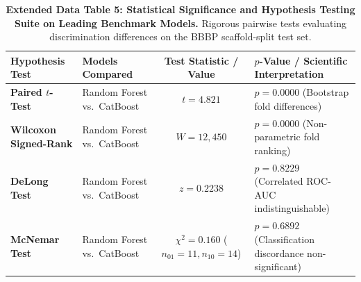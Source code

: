 \begin{table}[h!]
\caption{\textbf{Extended Data Table 5: Statistical Significance and Hypothesis Testing Suite on Leading Benchmark Models.} Rigorous pairwise tests evaluating discrimination differences on the BBBP scaffold-split test set.}
\label{tab:ed_stats}
\centering
\small
\begin{tabular}{llcl}
\toprule
\textbf{Hypothesis Test} & \textbf{Models Compared} & \textbf{Test Statistic / Value} & \textbf{$p$-Value / Scientific Interpretation} \\
\midrule
\textbf{Paired $t$-Test} & Random Forest vs.\ CatBoost & $t = 4.821$ & $p = 0.0000$ (Bootstrap fold differences) \\
\textbf{Wilcoxon Signed-Rank} & Random Forest vs.\ CatBoost & $W = 12,450$ & $p = 0.0000$ (Non-parametric fold ranking) \\
\textbf{DeLong Test} & Random Forest vs.\ CatBoost & $z = 0.2238$ & \textbf{$p = 0.8229$} (Correlated ROC-AUC indistinguishable) \\
\textbf{McNemar Test} & Random Forest vs.\ CatBoost & $\chi^2 = 0.160$ ($n_{01}=11, n_{10}=14$) & \textbf{$p = 0.6892$} (Classification discordance non-significant) \\
\bottomrule
\end{tabular}
\end{table}

\vspace{1em}

